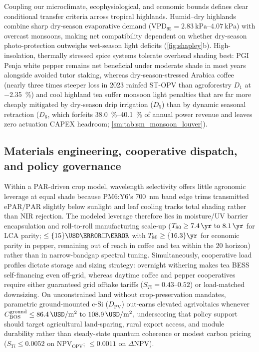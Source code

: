 \documentclass[preprint,12pt,a4paper]{elsarticle}
\begin{document}
Coupling our microclimate, ecophysiological, and economic bounds defines clear conditional transfer criteria across tropical highlands. Humid--dry highlands combine sharp dry-season evaporative demand ($\mathrm{VPD}_{95} = \qtyrange{2.83}{4.07}{\kilo\pascal}$) with overcast monsoons, making net compatibility dependent on whether dry-season photo-protection outweighs wet-season light deficits (\cref{fig:shapley}b). High-insolation, thermally stressed spice systems tolerate overhead shading best: PGI Penja white pepper remains net beneficial under moderate shade in most years alongside avoided tutor staking, whereas dry-season-stressed Arabica coffee (nearly three times steeper loss in 2023 rainfed ST-OPV than agroforestry $D_1$ at \qty{-2.35}{\percent}) and cool highland tea suffer monsoon light penalties that are far more cheaply mitigated by dry-season drip irrigation ($D_5$) than by dynamic seasonal retraction ($D_6$, which forfeits \qtyrange{38.0}{40.1}{\percent} of annual power revenue and leaves zero actuation CAPEX headroom; \cref{sm:tab:sm_monsoon_louver}).

\subsection{Materials engineering, cooperative dispatch, and policy governance}
\label{sec:disc_eng}

Within a PAR-driven crop model, wavelength selectivity offers little agronomic leverage at equal shade because PM6:Y6's \qty{700}{\nano\meter} band edge trims transmitted $\mathrm{ePAR}/\mathrm{PAR}$ slightly below sunlight and leaf cooling tracks total shading rather than NIR rejection. The modeled leverage therefore lies in moisture/UV barrier encapsulation and roll-to-roll manufacturing scale-up ($T_{80}\ge \qtyrange{7.4}{8.1}{\yr}$ for LCA parity; $\le \qty{15}{\USD\per\square\meter}$ with $T_{80}\ge \qty{16.3}{\yr}$ for economic parity in pepper, remaining out of reach in coffee and tea within the \qty{20}{\yr} horizon) rather than in narrow-bandgap spectral tuning. Simultaneously, cooperative load profiles dictate storage and sizing strategy: overnight withering makes tea BESS self-financing even off-grid, whereas daytime coffee and pepper cooperatives require either guaranteed grid offtake tariffs ($S_{Ti}=\numrange{0.43}{0.52}$) or load-matched downsizing. On unconstrained land without crop-preservation mandates, parametric ground-mounted c-Si ($D_{\mathrm{PV}}$) out-earns elevated agrivoltaics whenever $C_{\mathrm{BOS}}^{\mathrm{ground}} \le \qtyrange{86.4}{108.9}{\USD\per\square\meter}$, underscoring that policy support should target agricultural land-sparing, rural export access, and module durability rather than steady-state quantum coherence or modest carbon pricing ($S_{Ti} \le \num{0.0052}$ on $\mathrm{NPV}_{\mathrm{OPV}}$; $\le \num{0.0011}$ on $\Delta\mathrm{NPV}$).
\end{document}
